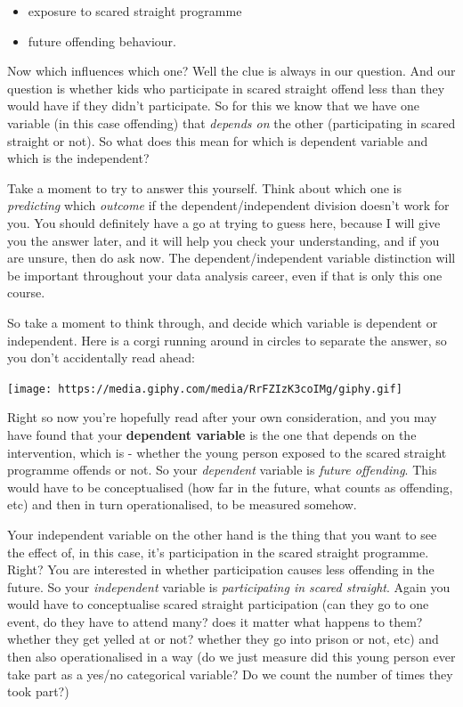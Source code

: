 \documentclass[]{book}
\providecommand{\tightlist}{%
  \setlength{\itemsep}{0pt}\setlength{\parskip}{0pt}}
\theoremstyle{definition}
\theoremstyle{definition}
\theoremstyle{definition}
\theoremstyle{remark}
\begin{document}
\begin{itemize}
\tightlist
\item
  exposure to scared straight programme
\item
  future offending behaviour.
\end{itemize}

Now which influences which one? Well the clue is always in our question.
And our question is whether kids who participate in scared straight
offend less than they would have if they didn't participate. So for this
we know that we have one variable (in this case offending) that
\emph{depends on} the other (participating in scared straight or not).
So what does this mean for which is dependent variable and which is the
independent?

Take a moment to try to answer this yourself. Think about which one is
\emph{predicting} which \emph{outcome} if the dependent/independent
division doesn't work for you. You should definitely have a go at trying
to guess here, because I will give you the answer later, and it will
help you check your understanding, and if you are unsure, then do ask
now. The dependent/independent variable distinction will be important
throughout your data analysis career, even if that is only this one
course.

So take a moment to think through, and decide which variable is
dependent or independent. Here is a corgi running around in circles to
separate the answer, so you don't accidentally read ahead:

\texttt{[image: https://media.giphy.com/media/RrFZIzK3coIMg/giphy.gif]}

Right so now you're hopefully read after your own consideration, and you
may have found that your \textbf{dependent variable} is the one that
depends on the intervention, which is - whether the young person exposed
to the scared straight programme offends or not. So your
\emph{dependent} variable is \emph{future offending}. This would have to
be conceptualised (how far in the future, what counts as offending, etc)
and then in turn operationalised, to be measured somehow.

Your independent variable on the other hand is the thing that you want
to see the effect of, in this case, it's participation in the scared
straight programme. Right? You are interested in whether participation
causes less offending in the future. So your \emph{independent} variable
is \emph{participating in scared straight}. Again you would have to
conceptualise scared straight participation (can they go to one event,
do they have to attend many? does it matter what happens to them?
whether they get yelled at or not? whether they go into prison or not,
etc) and then also operationalised in a way (do we just measure did this
young person ever take part as a yes/no categorical variable? Do we
count the number of times they took part?)
\end{document}
